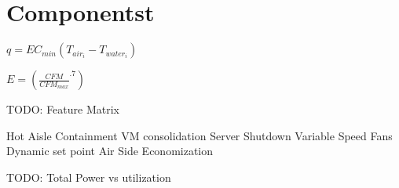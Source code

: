 \section{Componentst}

$q = E C_{min}(T_{air_i} - T_{water_i} )$

$E  = ( \frac{CFM}{CFM_{max}}^{.7} )$

TODO: Feature Matrix

Hot Aisle Containment
VM consolidation
Server Shutdown
Variable Speed Fans
Dynamic set point
Air Side Economization

TODO: Total Power vs utilization